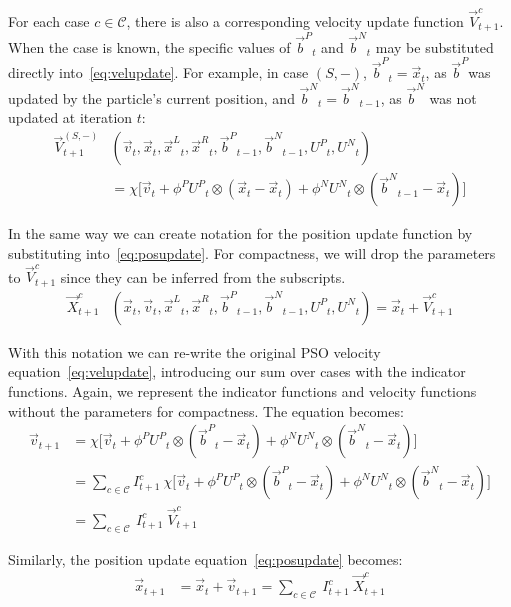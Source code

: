\documentclass[ms,electronic,twosidetoc,letterpaper,chaptercenter,parttop,equalmargins]{byumsphd}
\providecommand{\pers}{\ensuremath{P}}
\providecommand{\neigh}{\ensuremath{N}}
\providecommand{\leftind}{\ensuremath{L}}
\providecommand{\rightind}{\ensuremath{R}}
\providecommand{\nURand}{\ensuremath{U^\neigh}}
\providecommand{\pURand}{\ensuremath{U^\pers}}
\providecommand{\ppos}{\ensuremath{\Vec{x}}}
\providecommand{\pvel}{\ensuremath{\Vec{v}}}
\providecommand{\nbest}{\ensuremath{\Vec{b}^\neigh}}
\providecommand{\pbest}{\ensuremath{\Vec{b}^\pers}}
\providecommand{\constriction}{\ensuremath{\chi}}
\providecommand{\ncoeff}{\ensuremath{\phi^\neigh}}
\providecommand{\pcoeff}{\ensuremath{\phi^\pers}}
\providecommand{\indic}{\ensuremath{I}}
\providecommand{\specvel}{\ensuremath{\vec{V}}}
\providecommand{\specpos}{\ensuremath{\vec{X}}}
\providecommand{\leftn}{\ensuremath{\Vec{x}^\leftind}}
\providecommand{\rightn}{\ensuremath{\Vec{x}^\rightind}}
\providecommand{\caseset}{\ensuremath{\mathcal{C}}}
\providecommand{\casegen}{\ensuremath{c}}
\providecommand{\casexn}{\ensuremath{(S,-)}}
\begin{document}
For each case $\casegen \in \caseset$, there is also a corresponding
velocity update function $\specvel_{t+1}^{\casegen}$.  When the case is
known, the specific values of $\pbest_t$ and $\nbest_t$ may be substituted
directly into~\eqref{eq:velupdate}.  For example, in case $\casexn$,
$\pbest_{t}=\ppos_{t}$, as \pbest was updated by the particle's current
position, and $\nbest_{t}=\nbest_{t-1}$, as $\nbest$ was not updated at
iteration $t$:
\begin{align}
\nonumber
	\specvel_{t+1}^{\casexn} & (\pvel_t, \ppos_{t}, \leftn_{t}, \rightn_{t},
	\pbest_{t-1}, \nbest_{t-1}, \pURand_{t}, \nURand_{t}) \\
\label{eq:defvcasexn}
		&= \constriction \bigl[ \pvel_{t} +
			\pcoeff\pURand_{t}\otimes(\ppos_{t} - \ppos_{t})
			+ \ncoeff\nURand_{t}\otimes(\nbest_{t-1} -
			\ppos_{t}) \bigr]
\end{align}

In the same way we can create notation for the position update function by
substituting into~\eqref{eq:posupdate}.  For compactness, we will drop the
parameters to $\specvel_{t+1}^{\casegen}$ since they can be inferred from the
subscripts.
\begin{align}
\label{eq:defpcasegen}
	\specpos_{t+1}^{\casegen} & (\ppos_{t}, \pvel_{t}, \leftn_{t},
	\rightn_{t} ,\pbest_{t-1} ,\nbest_{t-1}, \pURand_{t}, \nURand_{t})
	= \ppos_{t} + \specvel_{t+1}^{\casegen}
\end{align}

With this notation we can re-write the original PSO velocity
equation~\eqref{eq:velupdate}, introducing our sum over cases with the
indicator functions.  Again, we represent the indicator functions and velocity
functions without the parameters for compactness.  The equation becomes:
\begin{align}
\nonumber
	\pvel_{t+1} &=
		\constriction \bigl[ \pvel_t
			+ \pcoeff\pURand_{t}\otimes(\pbest_{t} - \ppos_{t})
			+ \ncoeff\nURand_{t}\otimes(\nbest_{t} -
			\ppos_{t}) \bigr] \\
\nonumber
	&= \sum_{c \in \caseset} \indic_{t+1}^{c} \ \constriction \bigl[ \pvel_t
			+ \pcoeff\pURand_{t}\otimes(\pbest_{t} - \ppos_{t})
			+ \ncoeff\nURand_{t}\otimes(\nbest_{t} -
			\ppos_{t}) \bigr]  \\
\label{eq:vel2update}
	&= \sum_{c \in \caseset} \ \indic_{t+1}^{c} \ \specvel_{t+1}^{c}
\end{align}

Similarly, the position update equation~\eqref{eq:posupdate} becomes:
\begin{align}
\label{eq:pos2update}
	\ppos_{t+1} &= \ppos_{t} + \pvel_{t+1}
	= \sum_{c \in \caseset} \ \indic_{t+1}^{c} \ \specpos_{t+1}^{c} 
\end{align}
\end{document}

